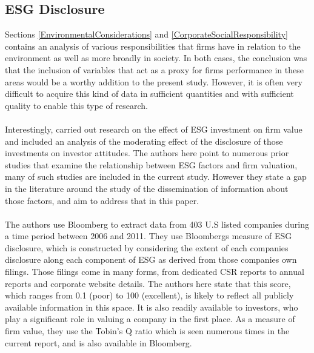 \subsection {ESG Disclosure} \label{ESGDisclosure}
{Sections \ref{EnvironmentalConsiderations} and \ref{CorporateSocialResponsibility} contains an analysis of various responsibilities that firms have in relation to the environment as well as more broadly in society. In both cases, the conclusion was that the inclusion of variables that act as a proxy for firms performance in these areas would be a worthy addition to the present study. However, it is often very difficult to acquire this kind of data in sufficient quantities and with sufficient quality to enable this type of research. \\\\
Interestingly, \cite{fatemiESG} carried out research on the effect of ESG investment on firm value and included an analysis of the moderating effect of the disclosure of those investments on investor attitudes. The authors here point to numerous prior studies that examine the relationship between ESG factors and firm valuation, many of such studies are included in the current study. However they state a gap in the literature around the study of the dissemination of information about those factors, and aim to address that in this paper.   \\\\
The authors use Bloomberg to extract data from 403 U.S listed companies during a time period between 2006 and 2011. They use Bloombergs measure of ESG disclosure, which is constructed by considering the extent of each companies disclosure along each component of ESG as derived from those companies own filings. Those filings come in many forms, from dedicated CSR reports to annual reports and corporate website details. The authors here state that this score, which ranges from 0.1 (poor) to 100 (excellent), is likely to reflect all publicly available information in this space. It is also readily available to investors, who play a significant role in valuing a company in the first place. As a measure of firm value, they use the Tobin's Q ratio which is seen numerous times in the current report, and is also available in Bloomberg. \\\\ 
}
